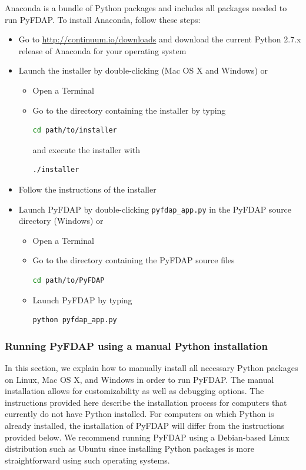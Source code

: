 \documentclass[a4paper,11pt]{article}
\begin{document}
Anaconda is a bundle of Python packages and includes all packages needed to run PyFDAP. To install Anaconda, follow these steps:

\begin{itemize}
 \item Go to \href{http://continuum.io/downloads}{http://continuum.io/downloads} and download the current Python 2.7.x release of Anaconda for your operating system 
 \item Launch the installer by double-clicking (Mac OS X and Windows) or 
 \begin{itemize}
 \item Open a Terminal
 \item Go to the directory containing the installer by typing
 \begin{lstlisting}[frame=single,language=bash]  
cd path/to/installer
\end{lstlisting}
and execute the installer with
 \begin{lstlisting}[frame=single,language=bash]  
./installer
\end{lstlisting}
 \end{itemize}
\item Follow the instructions of the installer
\item Launch PyFDAP by double-clicking \verb+pyfdap_app.py+ in the PyFDAP source directory (Windows) or
\begin{itemize}
 \item Open a Terminal
 \item Go to the directory containing the PyFDAP source files
 \begin{lstlisting}[frame=single,language=bash]  
cd path/to/PyFDAP
\end{lstlisting}
\item Launch PyFDAP by typing
 \begin{lstlisting}[frame=single,language=bash]  
python pyfdap_app.py
\end{lstlisting}
\end{itemize}
\end{itemize}

\subsubsection{Running PyFDAP using a manual Python installation}
\label{sec:manually}
In this section, we explain how to manually install all necessary Python packages on Linux, Mac OS X, and Windows in order to run PyFDAP. The manual installation allows for customizability as well as debugging options. The instructions provided here describe the installation process for computers that currently do not have Python installed. For computers on which Python is already installed, the installation of PyFDAP will differ from the instructions provided below. We recommend running PyFDAP using a Debian-based Linux distribution such as Ubuntu since installing Python packages is more straightforward using such operating systems.
\end{document}
